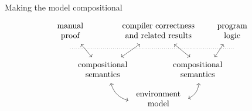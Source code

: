 \documentclass[aspectratio=1610,mathserif]{beamer}
\begin{document}
\begin{frame}[fragile]{Making the model compositional}
  \[
    \begin{tikzcd}[column sep=-2.5em, row sep=tiny]
      &
      \begin{array}{c} \text{manual} \\ \text{proof} \end{array}
      \ar[ddr, leftrightarrow] &&
      \begin{array}{c}
        \text{compiler correctness} \\
        \text{and related results}
      \end{array}
      \ar[ddl, leftrightarrow]
      \ar[ddr, leftrightarrow] &&
      \begin{array}{c} \text{program} \\ \text{logic} \end{array}
      \ar[ddl, leftrightarrow]
      \\
      {} \ar[rrrrrr, dotted, dash] &&&&&& {}
      \\
      &&
      \begin{array}{c}
        \text{compositional} \\
        \text{semantics}
      \end{array}
      \ar[dr, leftrightarrow, bend right]
      &&
      \hspace{-2em}
      \begin{array}{c}
        \text{compositional} \\
        \text{semantics}
      \end{array}
      \ar[dl, leftrightarrow, bend left]
      \\
      &&&
      \begin{array}{c}
        \text{environment} \\ \text{model}
      \end{array}
    \end{tikzcd}
  \]
\end{frame}
\end{document}
